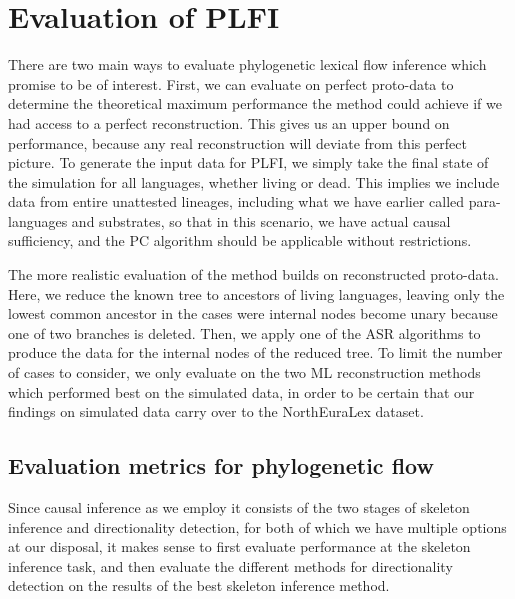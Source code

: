 \section{Evaluation of PLFI}\label{sec:6.9}
There are two main ways to evaluate phylogenetic lexical flow inference which promise to be of interest. First, we can evaluate on perfect proto-data to determine the theoretical maximum performance the method could achieve if we had access to a perfect reconstruction. This gives us an upper bound on performance, because any real reconstruction will deviate from this perfect picture. To generate the input data for PLFI, we simply take the final state of the simulation for all languages, whether living or dead. This implies we include data from entire unattested lineages, including what we have earlier called para-languages and substrates, so that in this scenario, we have actual causal sufficiency, and the PC algorithm should be applicable without restrictions.

The more realistic evaluation of the method builds on reconstructed proto-data. Here, we reduce the known tree to ancestors of living languages, leaving only the lowest common ancestor in the cases were internal nodes become unary because one of two branches is deleted. Then, we apply one of the ASR algorithms to produce the data for the internal nodes of the reduced tree. To limit the number of cases to consider, we only evaluate on the two ML reconstruction methods which performed best on the simulated data, in order to be certain that our findings on simulated data carry over to the NorthEuraLex dataset.

\subsection{Evaluation metrics for phylogenetic flow}
Since causal inference as we employ it consists of the two stages of skeleton inference and directionality detection, for both of which we have multiple options at our disposal, it makes sense to first evaluate performance at the skeleton inference task, and then evaluate the different methods for directionality detection on the results of the best skeleton inference method.

